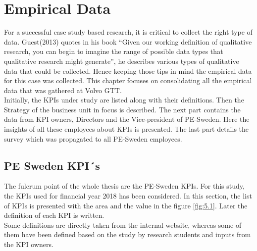 \chapter{Empirical Data}

For a successful case study based research, it is critical to collect the right type of data. Guest(2013) quotes in his book “Given our working definition of qualitative research, you can begin to imagine the range of possible data types that qualitative research might generate”, he describes various types of qualitative data that could be collected. Hence keeping those tips in mind the empirical data for this case was collected. This chapter focuses on consolidating all the empirical data that was gathered at Volvo GTT. \\

Initially, the KPIs under study are listed along with their definitions. Then the Strategy of the business unit in focus is described. The next part contains the data from KPI owners, Directors and the Vice-president of PE-Sweden. Here the insights of all these employees about KPIs is presented. The last part details the survey which was propagated to all PE-Sweden employees.

\section{PE Sweden KPI´s}

The fulcrum point of the whole thesis are the PE-Sweden KPIs. For this study, the KPIs used for financial year 2018 has been considered. In this section, the list of KPIs is presented with the area and the value in the figure \ref{fig:5.1}. Later the definition of each KPI is written.\\
Some definitions are directly taken from the internal website, whereas some of them have been defined based on the study by research students and inputs from the KPI owners.\\

